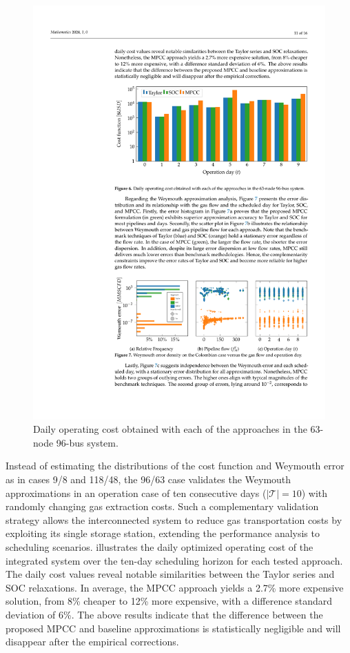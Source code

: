 \begin{figure}[h]
    \centering
    \includegraphics[scale=0.85]{figures/Chapter_MPCC/g005.pdf}
    \caption{Daily operating cost obtained with each of the approaches in the 63-node 96-bus system.}
    \label{fig:red_test_cost}
\end{figure}


Instead of estimating the distributions of the cost function and Weymouth error as in cases 9/8 and 118/48, the 96/63 case validates the Weymouth approximations in an operation case of ten consecutive days ($\left | \mathcal{T} \right | = 10 $) with randomly changing gas extraction costs. Such a complementary validation strategy allows the interconnected system to reduce gas transportation costs by exploiting its single storage station, extending the performance analysis to scheduling scenarios.
 illustrates the daily optimized operating cost of the integrated system over the ten-day scheduling horizon for each tested approach. The daily cost values reveal notable similarities between the Taylor series and SOC relaxations. In average, the MPCC approach yields a 2.7\% more expensive solution, from 8\% cheaper to 12\% more expensive, with a difference standard deviation of 6\%. The above results indicate that the difference between the proposed MPCC and baseline approximations is statistically negligible and will disappear after the empirical corrections.

